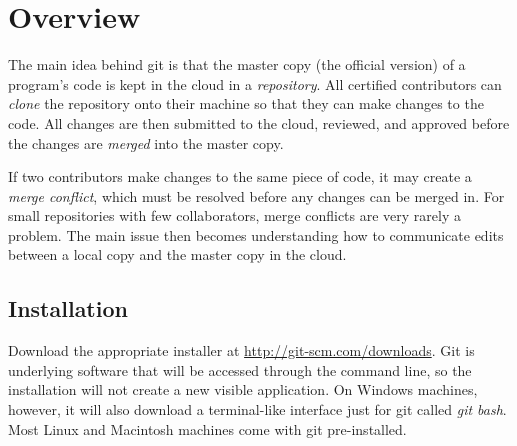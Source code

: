 \label{appendix:setup}


\section*{Overview} %

The main idea behind git is that the master copy (the official version) of a program's code is kept in the cloud in a \emph{repository}.
All certified contributors can \emph{clone} the repository onto their machine so that they can make changes to the code.
All changes are then submitted to the cloud, reviewed, and approved before the changes are \emph{merged} into the master copy.

If two contributors make changes to the same piece of code, it may create a \emph{merge conflict}, which must be resolved before any changes can be merged in.
For small repositories with few collaborators, merge conflicts are very rarely a problem.
The main issue then becomes understanding how to communicate edits between a local copy and the master copy in the cloud.

\subsection*{Installation} %

Download the appropriate installer at \url{http://git-scm.com/downloads}.
Git is underlying software that will be accessed through the command line, so the installation will not create a new visible application.
On Windows machines, however, it will also download a terminal-like interface just for git called \emph{git bash}.
Most Linux and Macintosh machines come with git pre-installed.

